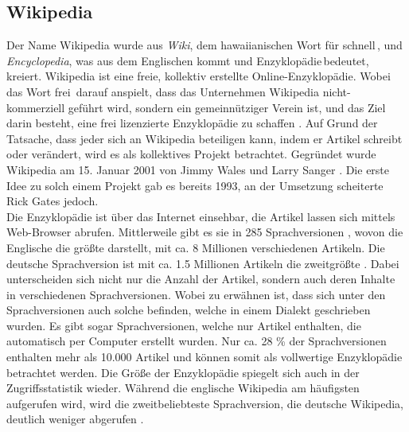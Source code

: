 \documentclass[fontsize=11pt, twoside, a4paper]{scrartcl}
\begin{document}
\subsection{Wikipedia}
Der Name Wikipedia wurde aus \textit{Wiki}, dem hawaiianischen Wort für \glqq schnell\grqq \,, und \textit{Encyclopedia}, was aus dem Englischen kommt und \glqq Enzyklopädie\grqq \,bedeutet, kreiert.
Wikipedia ist eine freie, kollektiv erstellte Online-Enzyklopädie. Wobei das Wort \glqq frei\grqq \, darauf anspielt, dass das Unternehmen Wikipedia nicht-kommerziell geführt wird, sondern ein gemeinnütziger Verein ist, und das Ziel darin besteht, eine frei lizenzierte Enzyklopädie zu schaffen \cite{Wikipedia}. Auf Grund der Tatsache, dass jeder sich an Wikipedia beteiligen kann, indem er Artikel schreibt oder verändert, wird es als kollektives Projekt betrachtet. Gegründet wurde Wikipedia am 15. Januar 2001 von Jimmy Wales und Larry Sanger \cite{Wikipedia}. Die erste Idee zu solch einem Projekt gab es bereits 1993, an der Umsetzung scheiterte Rick Gates jedoch.\\[\baselineskip]
Die Enzyklopädie ist über das Internet einsehbar, die Artikel lassen sich mittels Web-Browser abrufen. Mittlerweile gibt es sie in 285 Sprachversionen \cite{WikipediaSprachen}, wovon die Englische die größte darstellt, mit ca. 8 Millionen verschiedenen Artikeln. Die deutsche Sprachversion ist mit ca. 1.5 Millionen Artikeln die zweitgrößte \cite{WikipediaSprachen}. Dabei unterscheiden sich nicht nur die Anzahl der Artikel, sondern auch deren Inhalte in verschiedenen Sprachversionen. Wobei zu erwähnen ist, dass sich unter den Sprachversionen auch solche befinden, welche in einem Dialekt geschrieben wurden. Es gibt sogar Sprachversionen, welche nur Artikel enthalten, die automatisch per Computer erstellt wurden. Nur ca. 28 \% der Sprachversionen enthalten mehr als 10.000 Artikel \cite{ZehnDinge} und können somit als vollwertige Enzyklopädie betrachtet werden. Die Größe der Enzyklopädie spiegelt sich auch in der Zugriffsstatistik wieder. Während die englische Wikipedia am häufigsten aufgerufen wird, wird die zweitbeliebteste Sprachversion, die deutsche Wikipedia, deutlich weniger abgerufen \cite{Alexa}.\\
\end{document}
